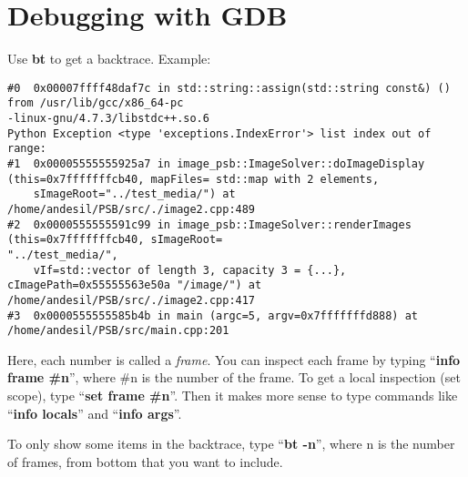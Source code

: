 \section{Debugging with GDB}

Use \textbf{bt} to get a backtrace.
Example:
\begin{verbatim}
#0  0x00007ffff48daf7c in std::string::assign(std::string const&) () from /usr/lib/gcc/x86_64-pc
-linux-gnu/4.7.3/libstdc++.so.6
Python Exception <type 'exceptions.IndexError'> list index out of range: 
#1  0x00005555555925a7 in image_psb::ImageSolver::doImageDisplay (this=0x7fffffffcb40, mapFiles= std::map with 2 elements, 
    sImageRoot="../test_media/") at /home/andesil/PSB/src/./image2.cpp:489
#2  0x0000555555591c99 in image_psb::ImageSolver::renderImages (this=0x7fffffffcb40, sImageRoot=
"../test_media/", 
    vIf=std::vector of length 3, capacity 3 = {...}, cImagePath=0x55555563e50a "/image/") at /home/andesil/PSB/src/./image2.cpp:417
#3  0x0000555555585b4b in main (argc=5, argv=0x7fffffffd888) at /home/andesil/PSB/src/main.cpp:201
\end{verbatim}

Here, each number is called a \textit{frame}. You can inspect each frame by
typing ``\textbf{info frame \#n}'', where \#n is the number of the frame. To get a local
inspection (set scope), type ``\textbf{set frame \#n}''.
Then it makes more sense to type commands like ``\textbf{info locals}'' and ``\textbf{info args}''.

To only show some items in the backtrace, type ``\textbf{bt -n}'', where n is the number of
frames, from bottom that you want to include.
